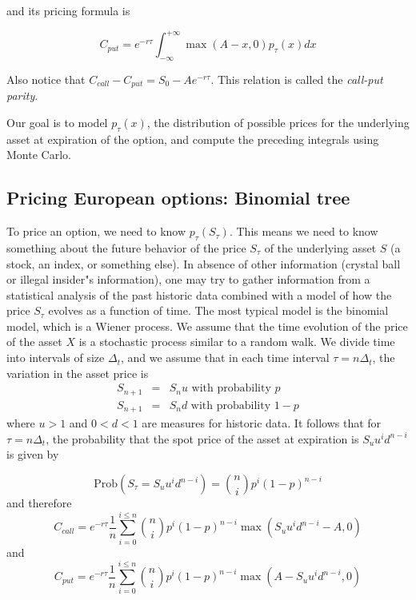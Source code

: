 \documentclass[justified, sixbynine]{tufte-book}
\theoremstyle{plain}%
\newtheorem * {corollary}{Corollary}
\theoremstyle{definition}
\theoremstyle{remark}
\newtheorem * {remark}{Remark}
\newtheorem * {note}{Note}
\begin{document}
\begin{fullwidth}
and its pricing formula is

\begin{equation}
C_{put}=e^{-r\tau }\int_{-\infty }^{+\infty }\max (A-x, 0)p_\tau (x)dx
\label{put_option}
\end{equation}

Also notice that $C_{call}-C_{put} = S_0 - A e^{-r\tau }$.
This relation is called the {\it call-put parity}.

Our goal is to model $p_\tau(x)$, the distribution of possible prices for the underlying asset at expiration of the option, and compute the preceding integrals using Monte Carlo.

\goodbreak\subsection{Pricing European options: Binomial tree}

To price an option, we need to know $p_\tau (S_\tau )$. This means we need to
know something about the future behavior of the price $S_\tau $ of the
underlying asset $S$ (a stock, an index, or something else). In absence of
other information (crystal ball or illegal insider"s information), one may
try to gather information from a statistical analysis of the past historic
data combined with a model of how the price $S_\tau $ evolves as a function of
time. The most typical model is the binomial model, which is a Wiener
process. We assume that the time evolution of the price of the asset $X$ is a
stochastic process similar to a random walk. We divide time into
intervals of size $\Delta _t$, and we assume that in each time interval $\tau
=n\Delta _t$, the variation in the asset price is
\begin{eqnarray}
S_{n+1} &=&S_nu\text{ with probability }p \\
S_{n+1} &=&S_nd\text{ with probability }1-p
\end{eqnarray}
where $u>1$ and $0<d<1$ are measures for historic data. It follows that for $%
\tau =n\Delta _t$, the probability that the spot price of the asset at
expiration is $S_uu^id^{n-i}$ is given by

\begin{equation}
\textrm{Prob}(S_\tau =S_uu^id^{n-i})=\binom nip^i(1-p)^{n-i}
\end{equation}
and therefore
\begin{equation}
C_{call}=e^{-r\tau }\frac 1n\sum_{i=0}^{i\leq n}\binom nip^i(1-p)^{n-i}\max
(S_uu^id^{n-i}-A, 0)  \label{bincall}
\end{equation}
and
\begin{equation}
C_{put}=e^{-r\tau }\frac 1n\sum_{i=0}^{i\leq n}\binom nip^i(1-p)^{n-i}\max
(A-S_uu^id^{n-i}, 0)  \label{binput}
\end{equation}


\end{fullwidth}
\end{document}
